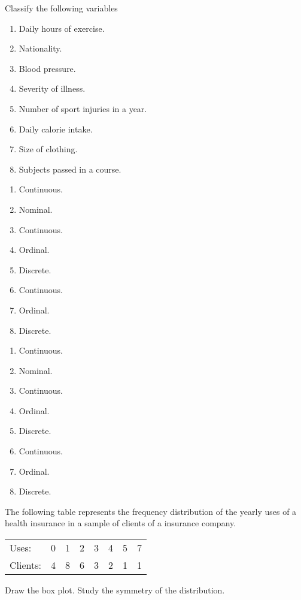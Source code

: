 {Classify the following variables
\begin{enumerate}
\item Daily hours of exercise.
\item Nationality.
\item Blood pressure.
\item Severity of illness.
\item Number of sport injuries in a year.
\item Daily calorie intake.
\item Size of clothing.
\item Subjects passed in a course.
\end{enumerate}
}
{\begin{enumerate}
\item Continuous.
\item Nominal.
\item Continuous.
\item Ordinal.
\item Discrete.
\item Continuous.
\item Ordinal.
\item Discrete.
\end{enumerate}
}
{\begin{enumerate}
\item Continuous.
\item Nominal.
\item Continuous.
\item Ordinal.
\item Discrete.
\item Continuous.
\item Ordinal.
\item Discrete.
\end{enumerate}
}


{The following table represents the frequency distribution of the yearly uses of a health insurance in a sample of
clients of a insurance company.

\begin{center}
\begin{tabular}{lrrrrrrr}
\toprule
Uses: & 0 & 1 & 2 & 3 & 4 & 5 & 7 \\
Clients: & 4 & 8 & 6 & 3 & 2 & 1 & 1\\
\bottomrule
\end{tabular}
\end{center}

Draw the box plot. Study the symmetry of the distribution.
}
{
}
{
}


